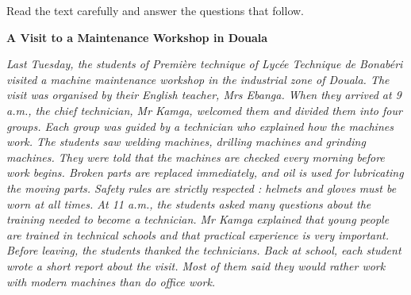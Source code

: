 \documentclass[11pt]{article}
\newcounter{popsec}
\newcounter{popsub}
\newcommand{\courssub}[1]{%
  \stepcounter{popsub}%
  \par\vspace{9pt}\noindent{\popxbold\fontsize{11.5}{13}\selectfont\color{popink}{\color{poporange}\thepopsec.\thepopsub}\hspace{6pt}#1}\par\nopagebreak\vspace{4pt}
}
\begin{document}
\courssub{Je me prépare au Bac}

\begin{exercice}
Read the text carefully and answer the questions that follow.

\textbf{A Visit to a Maintenance Workshop in Douala}

\emph{Last Tuesday, the students of Première technique of Lycée Technique de Bonabéri visited a machine maintenance workshop in the industrial zone of Douala. The visit was organised by their English teacher, Mrs Ebanga. When they arrived at 9 a.m., the chief technician, Mr Kamga, welcomed them and divided them into four groups. Each group was guided by a technician who explained how the machines work. The students saw welding machines, drilling machines and grinding machines. They were told that the machines are checked every morning before work begins. Broken parts are replaced immediately, and oil is used for lubricating the moving parts. Safety rules are strictly respected : helmets and gloves must be worn at all times. At 11 a.m., the students asked many questions about the training needed to become a technician. Mr Kamga explained that young people are trained in technical schools and that practical experience is very important. Before leaving, the students thanked the technicians. Back at school, each student wrote a short report about the visit. Most of them said they would rather work with modern machines than do office work.}


\end{exercice}
\end{document}
